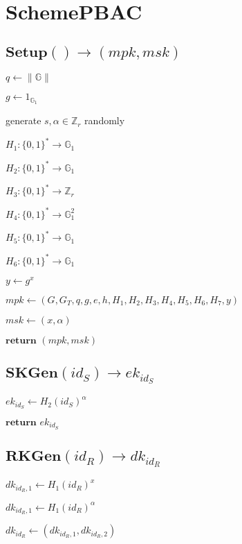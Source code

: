 \documentclass[a4paper]{article}
\begin{document}
\section{SchemePBAC}

\subsection{$\textbf{Setup}() \rightarrow (\textit{mpk}, \textit{msk})$}

$q \gets \|\mathbb{G}\|$

$g \gets 1_{\mathbb{G}_1}$

generate $s, \alpha \in \mathbb{Z}_r$ randomly

$H_1: \{0, 1\}^* \rightarrow \mathbb{G}_1$

$H_2: \{0, 1\}^* \rightarrow \mathbb{G}_1$

$H_3: \{0, 1\}^* \rightarrow \mathbb{Z}_r$

$H_4: \{0, 1\}^* \rightarrow \mathbb{G}_1^2$

$H_5: \{0, 1\}^* \rightarrow \mathbb{G}_1$

$H_6: \{0, 1\}^* \rightarrow \mathbb{G}_1$

$y \gets g^x$

$ \textit{mpk} \gets (G, G_T, q, g, e, h, H_1, H_2, H_3, H_4, H_5, H_6, H_7, y)$

$\textit{msk} \gets (x, \alpha)$

$\textbf{return }(\textit{mpk}, \textit{msk})$

\subsection{$\textbf{SKGen}(\textit{id}_S) \rightarrow \textit{ek}_{\textit{id}_S}$}

$\textit{ek}_{\textit{id}_S} \gets H_2(\textit{id}_S)^\alpha$

$\textbf{return }\textit{ek}_{\textit{id}_S}$

\subsection{$\textbf{RKGen}(\textit{id}_R) \rightarrow \textit{dk}_{\textit{id}_R}$}

$\textit{dk}_{\textit{id}_R, 1} \gets H_1(\textit{id}_R)^x$

$\textit{dk}_{\textit{id}_R, 1} \gets H_1(\textit{id}_R)^\alpha$

$\textit{dk}_{\textit{id}_R} \gets (\textit{dk}_{\textit{id}_R, 1}, \textit{dk}_{\textit{id}_R, 2})$
\end{document}
